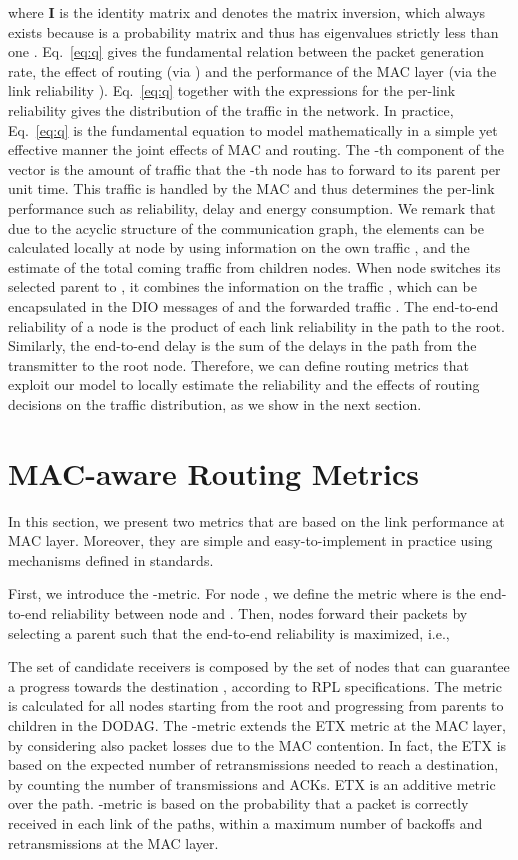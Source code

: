 \documentclass[review, 1p, 11pt]{elsarticle}
\numberwithin{equation}{section}
\begin{document}
where \textbf{I} is the identity matrix and  denotes the
matrix inversion, which always exists because  is
a probability matrix and thus has eigenvalues strictly less than one \cite{matrix}. Eq.~\eqref{eq:q} gives the fundamental relation
between the packet generation rate, the effect of routing (via
) and the performance of the MAC layer (via the link
reliability ). Eq.~\eqref{eq:q} together with the
expressions for the per-link reliability  gives the distribution of the
traffic in the network. In practice, Eq.~\eqref{eq:q} is the
fundamental equation to model mathematically in a simple yet effective manner the joint effects of
MAC and routing. The -th component of the vector  is the
amount of traffic that the -th node has to forward to its parent per
unit time. This traffic is handled by the MAC and thus
determines the per-link performance such as reliability, delay
and energy consumption.
We remark that due to the acyclic structure of the communication graph,
the elements  can be calculated locally at node  by using information on the own traffic
, and the estimate of the total coming traffic from children nodes.
When node  switches its selected parent to , it combines the information on the
traffic , which can be encapsulated in the DIO messages of  and the forwarded traffic .
The end-to-end reliability of a
node is the product of each link reliability in the path to the
root. Similarly, the end-to-end delay is the sum of the delays in
the path from the transmitter to the root node.
Therefore, we can define routing metrics that exploit our model to locally estimate the reliability and the effects of routing decisions on the traffic distribution, as we show in the next section.


\section{MAC-aware Routing Metrics} \label{sec:mac-aware}
In this section, we present two metrics that are based on the link performance at MAC layer. Moreover, they are simple and easy-to-implement in practice using mechanisms defined in standards.

First, we introduce the -metric. For node , we define the metric 
where   is the end-to-end reliability between node  and .
Then, nodes forward their packets by selecting a parent  such that the
end-to-end reliability is maximized, i.e.,

 The set of candidate receivers  is composed by the set of nodes that can guarantee a progress towards the destination , according to RPL specifications.
 The metric is calculated for all nodes starting from the root  and progressing from parents to children in the DODAG.
The -metric extends the ETX metric at the MAC layer, by considering also packet losses due to the MAC contention.
In fact, the ETX is based on the expected number of retransmissions needed to reach a destination, by counting the number of transmissions and ACKs. ETX is an additive metric over the path. -metric is based on the probability that a packet is correctly received in each link of the paths, within a maximum number of backoffs and retransmissions at the MAC layer.
\end{document}
